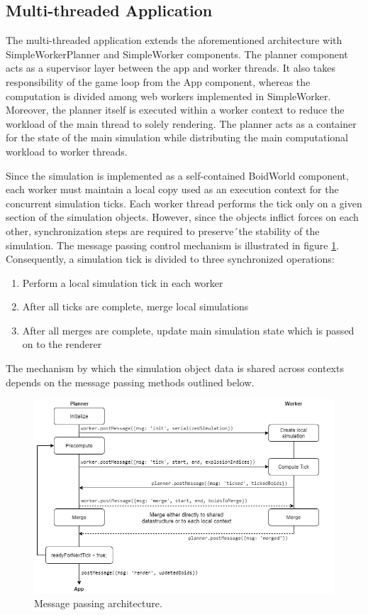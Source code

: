\documentclass[conference, 9pt]{IEEEtran}
\begin{document}
\subsection{Multi-threaded Application}
The multi-threaded application extends the aforementioned architecture with SimpleWorkerPlanner and SimpleWorker components. The planner component acts as a supervisor layer between the app and worker threads. It also takes responsibility of the game loop from the App component, whereas the computation is divided among web workers implemented in SimpleWorker. Moreover, the planner itself is executed within a worker context to reduce the workload of the main thread to solely rendering. The planner acts as a container for the state of the main simulation while distributing the main computational workload to worker threads.

Since the simulation is implemented as a self-contained BoidWorld component, each worker must maintain a local copy used as an execution context for the concurrent simulation ticks. Each worker thread performs the tick only on a given section of the simulation objects. However, since the objects inflict forces on each other, synchronization steps are required to preserve´the stability of the simulation. The message passing control mechanism is illustrated in figure \ref{fig:message_architecture}. Consequently, a simulation tick is divided to three synchronized operations:

\begin{enumerate}
  \item Perform a local simulation tick in each worker
  \item After all ticks are complete, merge local simulations
  \item After all merges are complete, update main simulation state which is passed on to the renderer
\end{enumerate}

The mechanism by which the simulation object data is shared across contexts depends on the message passing methods outlined below.

\begin{figure}[ht]
	\centering
	\includegraphics[scale=0.3]{figs/message_architecture.png}
	\caption{Message passing architecture.}
	\label{fig:message_architecture}
\end{figure}
\end{document}
